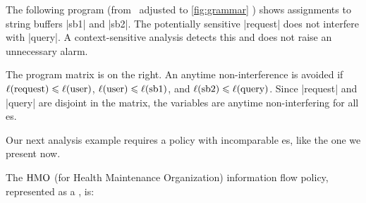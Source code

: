 \begin{example}\label{ex:sql}
The following program (from~\textcite{huang2014} adjusted to
\autoref{fig:grammar} ) shows assignments to string buffers
\prc|sb1| and \prc|sb2|. The potentially sensitive \prc|request| does not
interfere with \prc|query|. A context-sensitive analysis detects this and does
not raise an unnecessary alarm.

\begin{center}
\begin{minipage}{.6\textwidth}
\end{minipage}\hfill%
\begin{minipage}{.30\textwidth}
\end{minipage}
\end{center}

The program matrix is on the right. An anytime
non-interference  is avoided if
\(\lvl{\prc|request|} \leqslant \lvl{\prc|user|}\), \(\lvl{\prc|user|} \leqslant
\lvl{\prc|sb1|}\), and \(\lvl{\prc|sb2|} \leqslant
\lvl{\prc|query|}\). Since \prc|request| and \prc|query| are
disjoint in the matrix, the variables are anytime non-interfering for all
es.
\end{example}

Our next analysis example requires a policy with incomparable es, like the one we present now.

\begin{example}\label{ex-hasse-diagram-HMO} The
\(\mathrm{HMO}\) (for Health Maintenance Organization) information flow
policy, represented as a , is:

\begin{center}
\begin{minipage}{.8\textwidth}
{\centering


}
\end{minipage}
\end{center}
\end{example}

